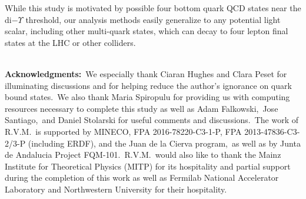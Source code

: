 \documentclass[nofootinbib,twocolumn,prl,preprintnumbers]{revtex4-1}
\begin{document}
While this study is motivated by possible four bottom quark QCD states near the di$-\Upsilon$ threshold, our analysis methods easily generalize to any potential light scalar, including other multi-quark states, which can decay to four lepton final states at the LHC or other colliders.


~\\
\noindent
{\bf Acknowledgments:}~We especially thank Ciaran Hughes and Clara Peset for illuminating discussions and for helping reduce the author's ignorance on quark bound states.~We also thank Maria Spiropulu for providing us with computing resources necessary to complete this study as well as Adam Falkowski,~Jose Santiago,~and Daniel Stolarski for useful comments and discussions.~The work of R.V.M.~is supported by MINECO, FPA 2016-78220-C3-1-P, FPA 2013-47836-C3-2/3-P (including ERDF), and the Juan de la Cierva program,~as well as by Junta de Andalucia Project FQM-101.~R.V.M.~would also like to thank the Mainz Institute for Theoretical Physics (MITP) for its hospitality and partial support during the completion of this work as well as Fermilab National Accelerator Laboratory and Northwestern University for their hospitality.
%



\end{document}
